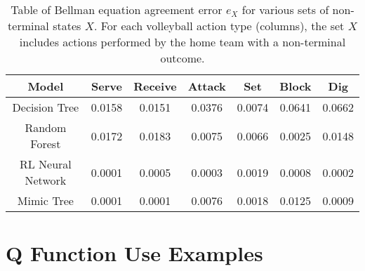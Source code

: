 \documentclass{sfuthesis}
\begin{document}
	\begin{table}
		\centering
		\begin{tabular}{c|cccccc}
			\textbf{Model}    & \textbf{Serve} & \textbf{Receive} & \textbf{Attack} & \textbf{Set} & \textbf{Block} & \textbf{Dig} \\ \hline
			Decision Tree     & 0.0158                  & 0.0151                    & 0.0376                   & 0.0074                & 0.0641                  & 0.0662                \\
			Random Forest     & 0.0172                  & 0.0183                    & 0.0075                   & 0.0066                & 0.0025                  & 0.0148                \\
			RL Neural Network & 0.0001                  & 0.0005                    & 0.0003                   & 0.0019                & 0.0008                  & 0.0002                \\
			Mimic Tree        & 0.0001                  & 0.0001                    & 0.0076                   & 0.0018                & 0.0125                  & 0.0009               
		\end{tabular}
		\caption{Table of Bellman equation agreement error $e_X$ for various sets of non-terminal states $X$. For each volleyball action type (columns), the set $X$ includes actions performed by the home team with a non-terminal outcome.}
		\label{tab:bellman-agreement}
	\end{table}
	
	\chapter{Q Function Use Examples}
\end{document}
